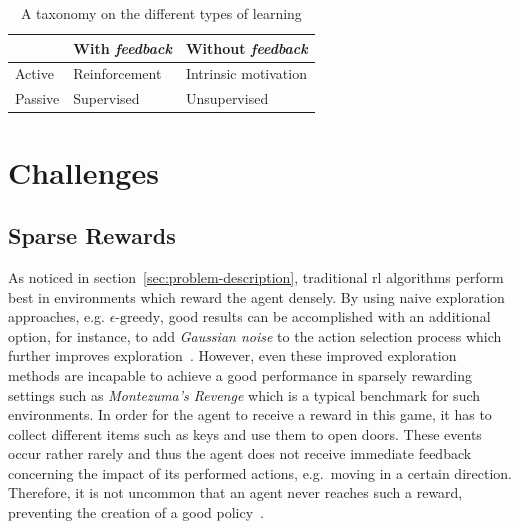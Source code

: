 \documentclass[draft,final]{vutinfth} %
\newcommand{\p}[1]{see p. #1}
\begin{document}
    \begin{table}
        \centering
        \begin{tabular}{|l|l|l|}
            \hline
            & With \textit{feedback} & Without \textit{feedback} \\
            \hline
            Active  & Reinforcement          & Intrinsic motivation      \\
            \hline
            Passive & Supervised             & Unsupervised              \\
            \hline
        \end{tabular}
        \caption[A taxonomy on the different types of learning]{A taxonomy on the different types of learning\protect\footnotemark}
        \label{tab:type_learning}
    \end{table}

    \footnotetext{\citep[\p{4}]{aubret_survey_2019}}


    \section{Challenges}

    \subsection{Sparse Rewards}\label{subsec:sparse-rewards}

    As noticed in section~\ref{sec:problem-description}, traditional \gls{rl} algorithms perform best in environments which reward the agent densely.
    By using naive exploration approaches, e.g. $\epsilon\text{-greedy}$, good results can be accomplished with an additional option, for instance, to add \textit{Gaussian noise} to the action selection process which further improves exploration~\citep{lillicrap_continuous_2019}.
    However, even these improved exploration methods are incapable to achieve a good performance in sparsely rewarding settings such as \textit{Montezuma's Revenge} which is a typical benchmark for such environments.
    In order for the agent to receive a reward in this game, it has to collect different items such as keys and use them to open doors.
    These events occur rather rarely and thus the agent does not receive immediate feedback concerning the impact of its performed actions, e.g.\ moving in a certain direction.
    Therefore, it is not uncommon that an agent never reaches such a reward, preventing the creation of a good policy~\citep{aubret_survey_2019}.
\end{document}
